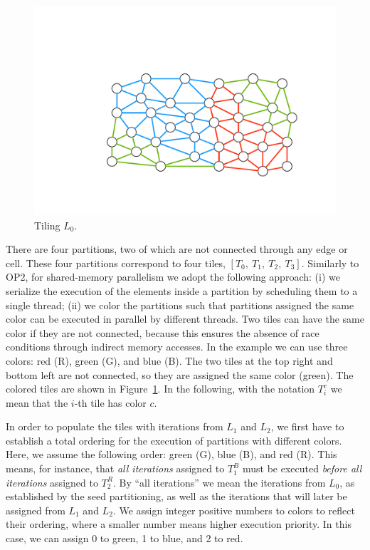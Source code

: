\begin{figure}[h]
\centering
\includegraphics[width=\textwidth]{sparsetiling/figures/loop_0.pdf}
\caption{Tiling $L_0$.}
\label{fig:st-loop-0}
\end{figure}

There are four partitions, two of which are not connected through any edge or cell. These four partitions correspond to four tiles, $[T_0,\ T_1,\ T_2,\ T_3]$. Similarly to OP2, for shared-memory parallelism we adopt the following approach: (i) we serialize the execution of the elements inside a partition by scheduling them to a single thread; (ii) we color the partitions such that partitions assigned the same color can be executed in parallel by different threads. Two tiles can have the same color if they are not connected, because this ensures the absence of race conditions through indirect memory accesses. In the example we can use three colors: red (R), green (G), and blue (B). The two tiles at the top right and bottom left are not connected, so they are assigned the same color (green). The colored tiles are shown in Figure~\ref{fig:st-loop-0}. In the following, with the notation $T_i^c$ we mean that the $i$-th tile has color $c$. 

In order to populate the tiles with iterations from $L_1$ and $L_2$, we first have to establish a total ordering for the execution of partitions with different colors. Here, we assume the following order: green (G), blue (B), and red (R). This means, for instance, that \textit{all iterations} assigned to $T_1^B$ must be executed \textit{before all iterations} assigned to $T_2^R$. By ``all iterations'' we mean the iterations from $L_0$, as established by the seed partitioning, as well as the iterations that will later be assigned from $L_1$ and $L_2$. We assign integer positive numbers to colors to reflect their ordering, where a smaller number means higher execution priority. In this case, we can assign 0 to green, 1 to blue, and 2 to red.


